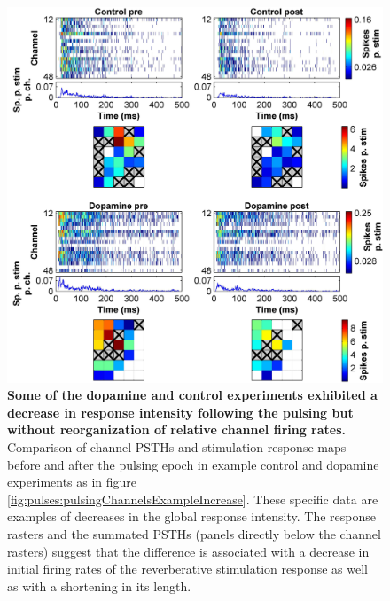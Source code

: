   \begin{figure}[!htb]
       \centering
       \includegraphics[width=15cm]{chapter6/figures/pulsingChannelsExample/pulsesChannelExampleDecrease.jpg}

       \caption[Channel PSTHs before and after administration of pulsing protocol with dopamine or control solutions - example of global decrease in response intensity]{\textbf{Some of the dopamine and control experiments exhibited a decrease in response intensity following the pulsing but without reorganization of relative channel firing rates.} Comparison of channel PSTHs and stimulation response maps before and after the pulsing epoch in example control and dopamine experiments as in figure \ref{fig:pulses:pulsingChannelsExampleIncrease}. These specific data are examples of decreases in the global response intensity. The response rasters and the summated PSTHs (panels directly below the channel rasters) suggest that the difference is associated with a decrease in initial firing rates of the reverberative stimulation response as well as with a shortening in its length.}

       \label{fig:pulses:pulsingChannelsExampleDecrease}
  \end{figure}

  

